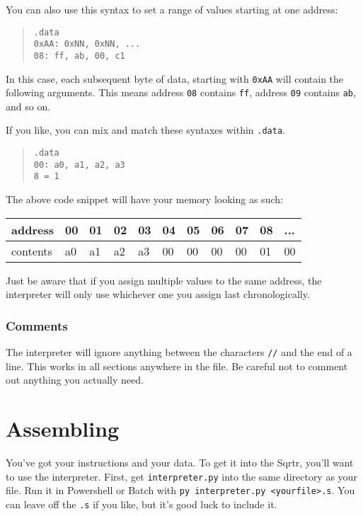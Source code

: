 \documentclass[12pt, oneside]{memoir}
\newcommand{\header}[1]{{\color{header}\texttt{#1}}}
\begin{document}
You can also use this syntax to set a range of values starting at one address:

\begin{quotation}\texttt{\header{.data}\\
    {\color{imm}0xAA}: {\color{imm}0xNN}, {\color{imm}0xNN}, ...\\
    {\color{imm}08}: {\color{imm}ff}, {\color{imm}ab}, {\color{imm}00}, {\color{imm}c1}
}\end{quotation}

In this case, each subsequent byte of data, starting with \texttt{{\color{imm}0xAA}} will contain the following arguments. This means address \texttt{{\color{imm}08}} contains \texttt{{\color{imm}ff}}, address \texttt{{\color{imm}09}} contains \texttt{{\color{imm}ab}}, and so on.

If you like, you can mix and match these syntaxes within \header{.data}.
\begin{quotation}\texttt{\header{.data}\\
    {\color{imm}00}: {\color{imm}a0}, {\color{imm}a1}, {\color{imm}a2}, {\color{imm}a3}\\
    {\color{imm}8} = {\color{imm}1}
}\end{quotation}
The above code snippet will have your memory looking as such:
\begin{table}[H]
    \begin{tabular}{|l|l|l|l|l|l|l|l|l|l|l|}
    \hline
    address  & 00 & 01 & 02 & 03 & 04 & 05 & 06 & 07 & 08 & ... \\ \hline
    contents & a0 & a1 & a2 & a3 & 00 & 00 & 00 & 00 & 01 & 00  \\ \hline
    \end{tabular}
\end{table}

Just be aware that if you assign multiple values to the same address, the interpreter will only use whichever one you assign last chronologically.

\subsection{Comments}
The interpreter will ignore anything between the characters \texttt{//} and the end of a line. This works in all sections anywhere in the file. Be careful not to comment out anything you actually need.

\chapter{Assembling}
\label{s2}
You've got your instructions and your data. To get it into the Sqrtr, you'll want to use the interpreter. First, get \texttt{interpreter.py} into the same directory as your file. Run it in Powershell or Batch with \texttt{py interpreter.py <yourfile>.s}. You can leave off the \texttt{.s} if you like, but it's good luck to include it.
\end{document}
